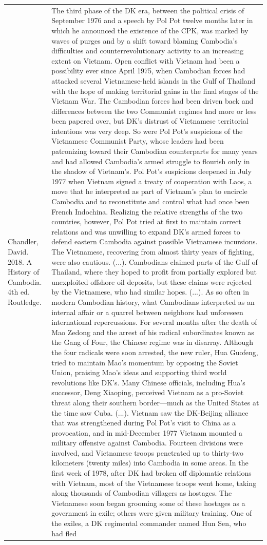 {\begin{longtable}{p{}p{}}
Chandler, David. 2018. A History of Cambodia. 4th ed. Routledge. & The third phase of the DK era, between the political crisis of September 1976 and a speech by Pol Pot twelve months later in which he announced the existence of the CPK, was marked by waves of purges and by a shift toward blaming Cambodia's difficulties and counterrevolutionary activity to an increasing extent on Vietnam. Open conflict with Vietnam had been a possibility ever since April 1975, when Cambodian forces had attacked several Vietnamese-held islands in the Gulf of Thailand with the hope of making territorial gains in the final stages of the Vietnam War. The Cambodian forces had been driven back and differences between the two Communist regimes had more or less been papered over, but DK's distrust of Vietnamese territorial intentions was very deep. So were Pol Pot's suspicions of the Vietnamese Communist Party, whose leaders had been patronizing toward their Cambodian counterparts for many years and had allowed Cambodia's armed struggle to flourish only in the shadow of Vietnam's. Pol Pot's suspicions deepened in July 1977 when Vietnam signed a treaty of cooperation with Laos, a move that he interpreted as part of Vietnam's plan to encircle Cambodia and to reconstitute and control what had once been French Indochina. Realizing the relative strengths of the two countries, however, Pol Pot tried at first to maintain correct relations and was unwilling to expand DK's armed forces to defend eastern Cambodia against possible Vietnamese incursions. The Vietnamese, recovering from almost thirty years of fighting, were also cautious. (...). Cambodians claimed parts of the Gulf of Thailand, where they hoped to profit from partially explored but unexploited offshore oil deposits, but these claims were rejected by the Vietnamese, who had similar hopes. (...). As so often in modern Cambodian history, what Cambodians interpreted as an internal affair or a quarrel between neighbors had unforeseen international repercussions. For several months after the death of Mao Zedong and the arrest of his radical subordinates known as the Gang of Four, the Chinese regime was in disarray. Although the four radicals were soon arrested, the new ruler, Hua Guofeng, tried to maintain Mao's momentum by opposing the Soviet Union, praising Mao's ideas and supporting third world revolutions like DK's. Many Chinese officials, including Hua's successor, Deng Xiaoping, perceived Vietnam as a pro-Soviet threat along their southern border—much as the United States at the time saw Cuba. (...). Vietnam saw the DK-Beijing alliance that was strengthened during Pol Pot's visit to China as a provocation, and in mid-December 1977 Vietnam mounted a military offensive against Cambodia. Fourteen divisions were involved, and Vietnamese troops penetrated up to thirty-two kilometers (twenty miles) into Cambodia in some areas. In the first week of 1978, after DK had broken off diplomatic relations with Vietnam, most of the Vietnamese troops went home, taking along thousands of Cambodian villagers as hostages. The Vietnamese soon began grooming some of these hostages as a government in exile; others were given military training. One of the exiles, a DK regimental commander named Hun Sen, who had fled 
\end{longtable}}
